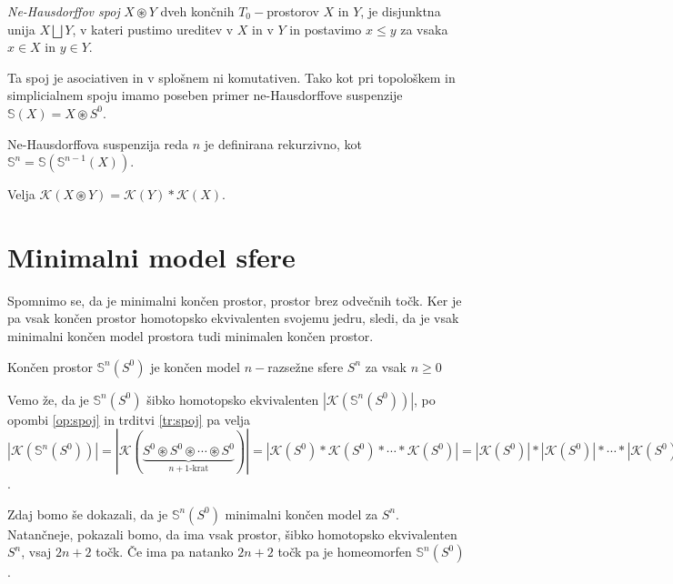 \documentclass[mat1]{fmfdelo}
\newcommand{\Sus}{\mathbb S}
\begin{document}
\begin{definicija}
    \emph{Ne-Hausdorffov spoj} $X\circledast Y$ dveh končnih $T_0-$prostorov
     $X$ in $Y$, je disjunktna unija $X\bigsqcup Y$, v kateri
     pustimo ureditev v $X$ in v $Y$ in postavimo $x\leq y$ za vsaka 
     $x\in X$ in $y\in Y$.
\end{definicija}

Ta spoj je asociativen in v splošnem ni komutativen. Tako kot pri topološkem
 in simplicialnem spoju imamo poseben primer ne-Hausdorffove suspenzije
  $\Sus(X)=X \circledast S^0$.

  Ne-Hausdorffova suspenzija reda $n$ je definirana rekurzivno, kot  $\Sus^n=\Sus(\Sus^{n-1}(X))$.
  \begin{opomba}
    Velja $\mathcal{K}(X\circledast Y) = \mathcal{K}(Y)\ast \mathcal{K}(X)$.
    \label{op:spoj}
  \end{opomba}

  \section{Minimalni model sfere}
  
  Spomnimo se, da je minimalni končen prostor, prostor brez odvečnih točk. Ker je pa vsak končen prostor homotopsko ekvivalenten svojemu jedru, sledi, da je vsak minimalni končen model prostora tudi minimalen končen prostor.
  
  \begin{trditev}
      Končen prostor $\Sus^n(S^0)$ je končen model $n-$razsežne sfere $S^n$ za vsak $n\geq 0$
  \end{trditev}
  
  \begin{dokaz}
      Vemo že, da je $\Sus^n(S^0)$ šibko homotopsko ekvivalenten $|\mathcal{K}(\Sus^n(S^0))|$,
      po\\ opombi \ref{op:spoj} in trditvi \ref{tr:spoj} pa velja $|\mathcal{K}(\Sus^n(S^0))|=|\mathcal{K}(\underbrace{S^0\circledast S^0 \circledast \cdots \circledast S^0}_\text{$n+1$-krat})|=
      |\mathcal{K}(S^0)\ast\mathcal{K}(S^0) \ast \cdots \ast \mathcal{K}(S^0)|=|\mathcal{K}(S^0)|\ast
      |\mathcal{K}(S^0)| \ast \cdots \ast |\mathcal{K}(S^0)|=S^0\ast
      S^0 \ast \cdots \ast S^0=S^n$.
  \end{dokaz}

  Zdaj bomo še dokazali, da je $\Sus^n(S^0)$ minimalni končen model za $S^n$. Natančneje, pokazali bomo, da ima vsak prostor, šibko homotopsko ekvivalenten $S^n$, vsaj $2n+2$ točk. Če ima pa natanko $2n+2$ točk pa je homeomorfen $\Sus^n(S^0)$.
\end{document}
